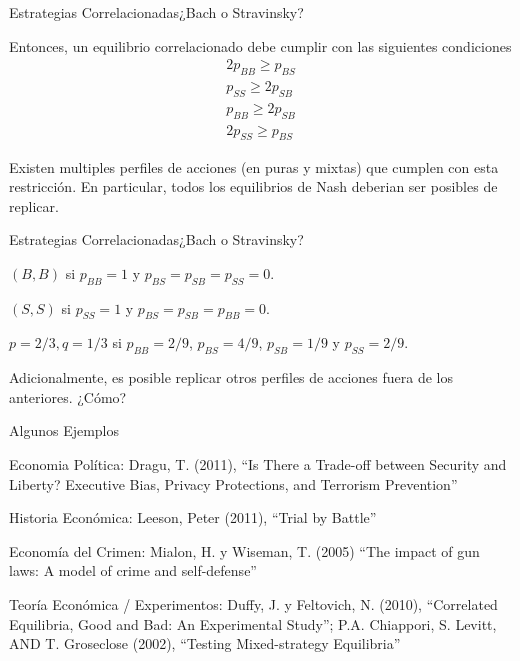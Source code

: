\documentclass[notes, 11pt]{beamer} %
\newenvironment{wideitemize}{\itemize\addtolength{\itemsep}{10pt}}{\enditemize}
\begin{document}
\begin{frame}{Estrategias Correlacionadas}{¿Bach o Stravinsky?}
\begin{wideitemize}
	\item<1-> Entonces, un equilibrio correlacionado debe cumplir con las siguientes condiciones
	\begin{align*}
		2p_{BB}	\geq p_{BS} \\
		p_{SS}	\geq 2p_{SB} \\
		p_{BB}	\geq 2p_{SB} \\
		2p_{SS}	\geq p_{BS} 
	\end{align*}

	\item<2-> Existen multiples perfiles de acciones (en puras y mixtas) que cumplen con esta restricci\'on. En particular, todos los equilibrios de Nash deberian ser posibles de replicar.
\end{wideitemize}
\end{frame}

\begin{frame}{Estrategias Correlacionadas}{¿Bach o Stravinsky?}
\begin{wideitemize}
	\item<1-> $(B,B)$ si $p_{BB} = 1$ y $p_{BS} = p_{SB} = p_{SS} = 0$.
	\item<2-> $(S,S)$ si $p_{SS} = 1$ y $p_{BS} = p_{SB} = p_{BB} = 0$.
	\item<3-> $p=2/3,q=1/3$ si $p_{BB} = 2/9$, $p_{BS} = 4/9$, $p_{SB} = 1/9$ y $p_{SS} = 2/9$.

	\item<4-> Adicionalmente, es posible replicar otros perfiles de acciones fuera de los anteriores. ¿C\'omo?
\end{wideitemize}
\end{frame}

\begin{frame}{Algunos Ejemplos}
	\begin{wideitemize}
		\item<1-> Economia Pol\'itica: Dragu, T. (2011), ``Is There a Trade-off between Security and Liberty? Executive Bias, Privacy Protections, and Terrorism Prevention''
		\item<2-> Historia Econ\'omica: Leeson, Peter (2011), ``Trial by Battle''
		\item<3-> Econom\'ia del Crimen: Mialon, H. y Wiseman, T. (2005) ``The impact of gun laws: A model of crime and self-defense''
		\item<4-> Teor\'ia Econ\'omica / Experimentos: Duffy, J. y Feltovich, N. (2010), ``Correlated Equilibria, Good and Bad: An Experimental Study''; P.A. Chiappori, S. Levitt, AND T. Groseclose (2002), ``Testing Mixed-strategy Equilibria''
	\end{wideitemize}
\end{frame}

\begin{frame}
\maketitle
\end{frame}
\end{document}
